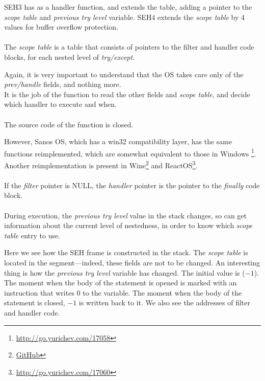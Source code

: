 
SEH3 has  
as a handler function, and extends the  table, adding
a pointer to the \emph{scope table} and \emph{previous try level} variable.
SEH4 extends the \emph{scope table} 
by 4 values for buffer overflow protection.\\
\\
The \emph{scope table} is a table that consists of pointers to the filter and handler code blocks, for each nested level of \emph{try/except}.



Again, it is very important to understand that the \ac{OS} takes care only of the \emph{prev/handle} fields, and nothing more.\\
It is the job of the  function to read the other fields and \emph{scope table}, and decide
which handler to execute and when.\\
\\
The source code of the  function is closed.

However, Sanos OS, which has a win32 compatibility layer, has the same
functions reimplemented, which are somewhat equivalent to those in Windows
\footnote{\url{http://go.yurichev.com/17058}}.
Another reimplementation is present in 
Wine\footnote{\href{http://go.yurichev.com/17059}{GitHub}}
and ReactOS\footnote{\url{http://go.yurichev.com/17060}}.\\
\\
If the \emph{filter} pointer is NULL, the \emph{handler} 
pointer is the pointer to the \emph{finally} code block.\\
\\
During execution, the \emph{previous try level} value in the stack changes, so
 can get information about the current level of nestedness, 
in order to know which \emph{scope table} entry to use.






Here we see how the SEH frame is constructed in the stack.
The \emph{scope table} is located in the  segment---indeed, these fields are not to be changed.
An interesting thing is how the \emph{previous try level} variable has changed.
The initial value is  ($-1$).
The moment when the body of the  
statement is opened is marked with an instruction that writes 0 to the variable.
The moment when the body of the  statement is closed, $-1$ 
is written back to it.
We also see the addresses of filter and handler code.

